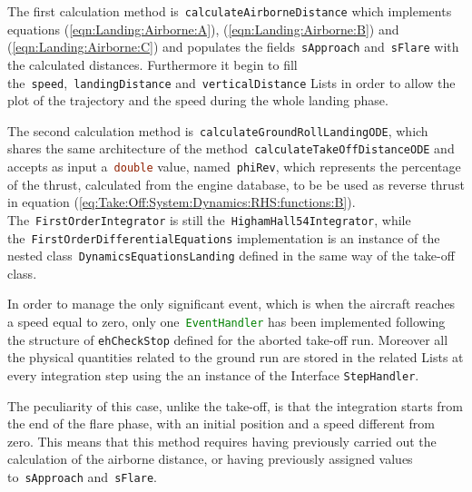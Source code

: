 \bigskip
\noindent
The first calculation method is~\lstinline[language=Java]!calculateAirborneDistance! which implements equations (\ref{eqn:Landing:Airborne:A}), (\ref{eqn:Landing:Airborne:B}) and (\ref{eqn:Landing:Airborne:C}) and populates the fields~\lstinline[language=Java]!sApproach! and~\lstinline[language=Java]!sFlare! with the calculated distances. Furthermore it begin to fill the~\lstinline[language=Java]!speed!,~\lstinline[language=Java]!landingDistance! and~\lstinline[language=Java]!verticalDistance! \gls{List}s in order to allow the plot of the trajectory and the speed during the whole landing phase.

\bigskip
\noindent
The second calculation method is~\lstinline[language=Java]!calculateGroundRollLandingODE!, which shares the same architecture of the method~\lstinline[language=Java]!calculateTakeOffDistanceODE! and accepts as input a~\lstinline[language=Java]!double! value, named~\lstinline[language=Java]!phiRev!, which represents the percentage of the thrust, calculated from the engine database, to be be used as reverse thrust in equation (\ref{eq:Take:Off:System:Dynamics:RHS:functions:B}). The~\lstinline[language=Java]!FirstOrderIntegrator! is still the~\lstinline[language=Java]!HighamHall54Integrator!, while the~\lstinline[language=Java]!FirstOrderDifferentialEquations! implementation is an instance of the nested class~\lstinline[language=Java]!DynamicsEquationsLanding! defined in the same way of the take-off class.

\bigskip
\noindent
In order to manage the only significant event, which is when the aircraft reaches a speed equal to zero, only one~\lstinline[language=Java]!EventHandler! has been implemented following the structure of \lstinline[language=Java]!ehCheckStop! defined for the aborted take-off run. Moreover all the physical quantities related to the ground run are stored in the related \gls{List}s at every integration step using the an instance of the \gls{Interface} \lstinline[language=Java]!StepHandler!.

\bigskip
\noindent
The peculiarity of this case, unlike the take-off, is that the integration starts from the end of the flare phase, with an initial position and a speed different from zero. This means that this method requires having previously carried out the calculation of the airborne distance, or having previously assigned values to~\lstinline[language=Java]!sApproach! and~\lstinline[language=Java]!sFlare!. 

